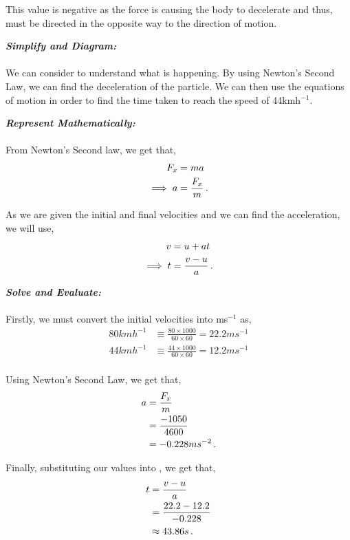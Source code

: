 \begin{subquestions}
\begin{subsubquestions}
			This value is negative as the force is causing the body to decelerate and thus, must be directed in the opposite way to the direction of motion.
			
			
			\subsubquestion
			\textbf{\textit{Simplify and Diagram:}} \\ \\
			We can consider  to understand what is happening. By using Newton's Second Law, we can find the deceleration of the particle. We can then use the equations of motion in order to find the time taken to reach the speed of 44kmh$^{-1}$.
			
			
			
			
			\textbf{\textit{Represent Mathematically:}} \\ \\
			From Newton's Second law, we get that,
			\begin{align}
				F_x & = ma \nonumber \\
				\implies a & = \frac{F_x}{m} \,.
			\end{align}
			
			As we are given the initial and final velocities and we can find the acceleration, we will use,
			\begin{align}
				v & = u + at \nonumber \\
				\implies t & = \frac{v-u}{a} \label{2016:q55:MotionEqn}\,.
			\end{align}
			
			
			
			
			\textbf{\textit{Solve and Evaluate:}} \\ \\
			Firstly, we must convert the initial velocities into ms$^{-1}$ as,
			\begin{align}
				80kmh^{-1} & \equiv \frac{80 \times 1000}{60 \times 60} = 22.2ms^{-1} \\
				44kmh^{-1} & \equiv \frac{44 \times 1000}{60 \times 60} = 12.2ms^{-1} \\
			\end{align}
			
			Using Newton's Second Law, we get that,
			\begin{align}
				a & = \frac{F_x}{m} \nonumber \\
				& = \frac{-1050}{4600} \nonumber \\
				& = -0.228ms^{-2} \,.
			\end{align}
			
			Finally, substituting our values into , we get that,
			\begin{align}
				t & = \frac{v-u}{a} \nonumber \\
				& = \frac{22.2-12.2}{-0.228} \nonumber \\
				& \approx 43.86s \,.
			\end{align}
			
		\end{subsubquestions}
		
	\end{subquestions}
